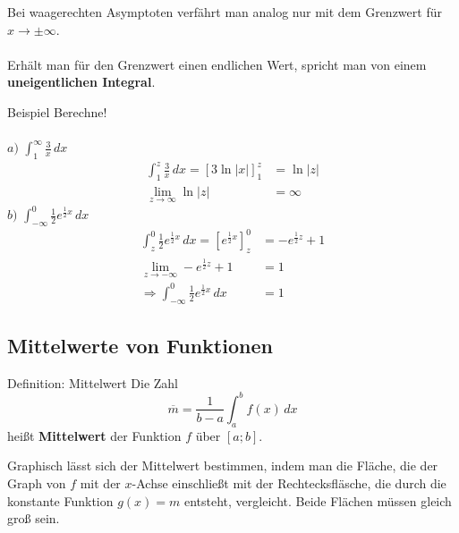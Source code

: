 \documentclass{article}
\begin{document}
Bei waagerechten Asymptoten verfährt man analog nur mit dem Grenzwert für $x \to \pm \infty$.
\\\\
Erhält man für den Grenzwert einen endlichen Wert, spricht man
von einem \textbf{uneigentlichen Integral}.

\begin{boxx}[DarkBlue]{Beispiel}
    Berechne! \\\\
    $a)$\hspace{3mm} $\displaystyle \int_1^\infty \frac{3}{x} \, dx$ \\
    \begin{align*}
        \int_1^z \frac{3}{x} \, dx = \left[3 \ln|x|\right]_1^z 
        &= \ln|z| \\
        \lim_{z \to \infty} \ln|z|  &= \infty 
    \end{align*}
    $b)$\hspace{3mm} $\displaystyle \int_{-\infty}^0 \frac{1}{2} e^{\frac{1}{2}x} \, dx$
    \begin{align*}
        \int_z^0 \frac{1}{2} e^{\frac{1}{2}x} \, dx = \left[e^{\frac{1}{2}x}\right]_z^0
        &= -e^{\frac{1}{2}z} + 1 \\
        \lim_{z \to -\infty} -e^{\frac{1}{2}z} + 1 &= 1 \\
        \Rightarrow \int_{-\infty}^0 \frac{1}{2} e^{\frac{1}{2}x} \, dx &= 1
    \end{align*}
\end{boxx}

\newpage

\subsection{Mittelwerte von Funktionen}
\begin{boxx}[Red]{Definition: Mittelwert}
    Die Zahl 
    \[\overline{m} = \frac{1}{b-a}\int_a^b f(x) \, dx\]
    heißt \textbf{Mittelwert} der Funktion $f$ über $[a;b]$.
\end{boxx}

Graphisch lässt sich der Mittelwert bestimmen, indem man die Fläche,
die der Graph von $f$ mit der $x$-Achse einschließt mit der 
Rechtecksfläsche, die durch die konstante Funktion $g(x) = m$
entsteht, vergleicht. Beide Flächen müssen gleich groß sein.
\end{document}
